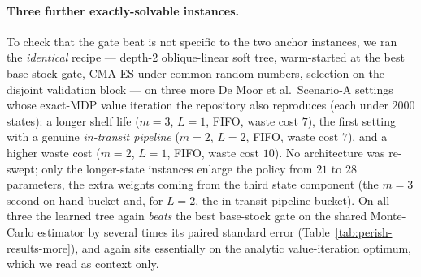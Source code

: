 \paragraph{Three further exactly-solvable instances.}
To check that the gate beat is not specific to the two anchor instances, we ran the
\emph{identical} recipe --- depth-2 oblique-linear soft tree, warm-started at the best
base-stock gate, CMA-ES under common random numbers, selection on the disjoint validation
block --- on three more De Moor et al.\ Scenario-A settings whose exact-MDP value iteration
the repository also reproduces (each under $2000$ states): a longer shelf life ($m=3$,
$L=1$, FIFO, waste cost $7$), the first setting with a genuine \emph{in-transit pipeline}
($m=2$, $L=2$, FIFO, waste cost $7$), and a higher waste cost ($m=2$, $L=1$, FIFO, waste
cost $10$). No architecture was re-swept; only the longer-state instances enlarge the policy
from $21$ to $28$ parameters, the extra weights coming from the third state component (the
$m=3$ second on-hand bucket and, for $L=2$, the in-transit pipeline bucket). On all three the
learned tree again \emph{beats} the best base-stock gate on the shared Monte-Carlo estimator
by several times its paired standard error (Table~\ref{tab:perish-results-more}), and again
sits essentially on the analytic value-iteration optimum, which we read as context only.

